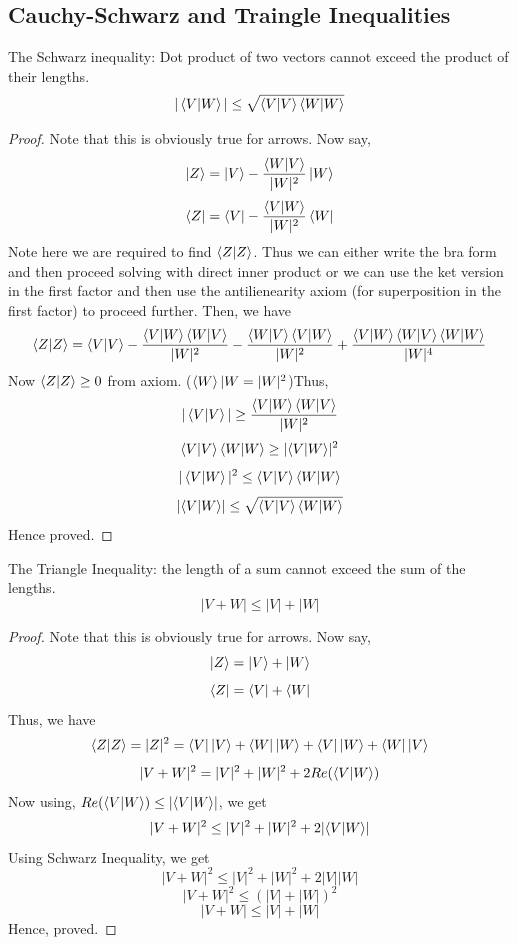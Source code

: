 \subsection{Cauchy-Schwarz and Traingle Inequalities}
\begin{theorem}
    The Schwarz inequality: Dot product of two vectors cannot exceed the product of their lengths.
    \[|\braket{V|W}| \leq \sqrt{\braket{V|V}\braket{W|W}}\]
\end{theorem}
\begin{proof}
    Note that this is obviously true for arrows. Now say,
    \[\ket{Z}=\ket{V}-\frac{\braket{W|V}}{|W|^2}\ket{W}\]
    \[\bra{Z}=\bra{V}-\frac{\braket{V|W}}{|W|^2}\bra{W}\]
    Note  here we are required to find $\braket{Z|Z}$. Thus we can either write the bra form and then proceed solving with direct 
    inner product or we can use the ket version in the first factor and then use the antilienearity axiom (for superposition in the first factor) to proceed further. Then, we have
    \[\braket{Z|Z}=\braket{V|V}-\frac{\braket{V|W}\braket{W|V}}{|W|^2}-\frac{\braket{W|V}\braket{V|W}}{|W|^2}+\frac{\braket{V|W}\braket{W|V}\braket{W|W}}{|W|^4}\]
    Now $\braket{Z|Z}\geq 0$ from axiom. ($\braket{W}|W=|W|^2$)Thus,
    \[|\braket{V|V}| \geq \frac{\braket{V|W} \braket{W|V}}{|W|^2}\]
    \[\braket{V|V}\braket{W|W}\geq |{\braket{V|W}}|^2\]
    \[|\braket{V|W}|^2 \leq \braket{V|V}\braket{W|W}\]
    \[|{\braket{V|W}}| \leq \sqrt{\braket{V|V}\braket{W|W}}\]
    Hence proved.
\end{proof}
\begin{theorem}
    The Triangle Inequality: the length of a sum cannot exceed the sum of the lengths.
    \[|V+W| \leq |V| + |W|\]
\end{theorem}
\begin{proof}
    Note that this is obviously true for arrows. Now say,
    \[\ket{Z}=\ket{V}+\ket{W}\]
    \[\bra{Z}=\bra{V}+\bra{W}\]
    Thus, we have
    \[\braket{Z|Z}=|Z|^2=\bra{V}\ket{V}+\bra{W}\ket{W}+\bra{V}\ket{W}+\bra{W}\ket{V}\]
    \[|V+W|^2=|V|^2 + |W|^2 + 2Re(\braket{V|W})\]
    Now using, $Re(\braket{V|W}) \leq |{\braket{V|W}}|$, we get
    \[|{V+W}|^2 \leq |{V}|^2 + |{W}|^2 + 2|{\braket{V|W}}|\]
    Using Schwarz Inequality, we get
    \[|{V+W}|^2 \leq |{V}|^2 + |{W}|^2 + 2|{V}||{W}|\]
    \[|{V+W}|^2 \leq (|{V}|+|{W}|)^2\]
    \[|{V+W}| \leq |{V}| + |{W}|\]
    Hence, proved.
\end{proof}


